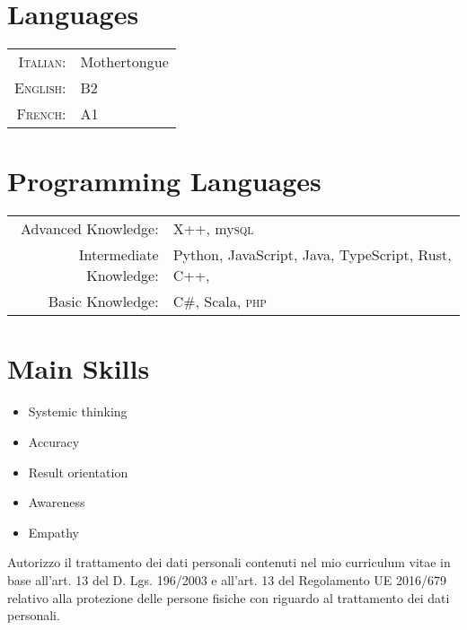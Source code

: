 \documentclass[a4paper,10pt]{article}
\begin{document}
\section{Languages}
\begin{tabular}{rl}
 \textsc{Italian:}&Mothertongue\\
\textsc{English:}& B2 \\
\textsc{French:}& A1 \\
\end{tabular}

\section{Programming Languages}
\begin{tabular}{rl}
 Advanced Knowledge:& X++, my\textsc{sql} \\
 Intermediate Knowledge:& Python, JavaScript,  Java, TypeScript, Rust, C++,  \\
 Basic Knowledge:& C\#, Scala, \textsc{php} \\
\end{tabular}

\section{Main Skills}
\begin{itemize}
	\itemsep -0.5em 
	\item Systemic thinking
	\item Accuracy
	\item Result orientation
	\item Awareness
	\item Empathy
\end{itemize}
\vspace{1.5cm}
Autorizzo il trattamento dei dati personali contenuti nel mio curriculum vitae in base all’art. 13 del D. Lgs. 196/2003 e all’art. 13 del Regolamento UE 2016/679 relativo alla protezione delle persone fisiche con riguardo al trattamento dei dati personali.

%
\end{document}
